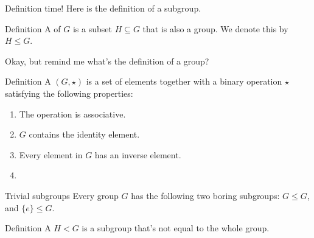 \documentclass[8pt, handout]{beamer}
\newcommand{\Pause}{\pause}      %
\begin{document}
\begin{frame}{Definition time!}
  Here is the definition of a subgroup. \smallskip

  \begin{block}{Definition}
    A  of $G$ is a subset $H\subseteq G$ that
    is also a group. We denote this by $H\leq G$.
  \end{block} \Pause

  \smallskip
  Okay, but remind me what's the definition of a group? \Pause
  \smallskip

  \begin{block}{Definition}
    A  $(G, \star)$ is a set of elements together with a binary operation $\star$ satisfying the following properties: \Pause
    \begin{enumerate}
      \item The operation is associative. \Pause
      \item $G$ contains the identity element. \Pause
      \item Every element in $G$ has an inverse element. \Pause
      \item {}
    \end{enumerate}
  \end{block}\Pause

  \begin{alertblock}{Trivial subgroups}
    Every group $G$ has the following two boring subgroups: $G\leq G$, and $\{e\} \leq G$.
  \end{alertblock}\Pause

  \begin{block}{Definition}
    A  $H < G$ is a subgroup that's not equal to the whole group.
  \end{block}
\end{frame}

\end{document}
